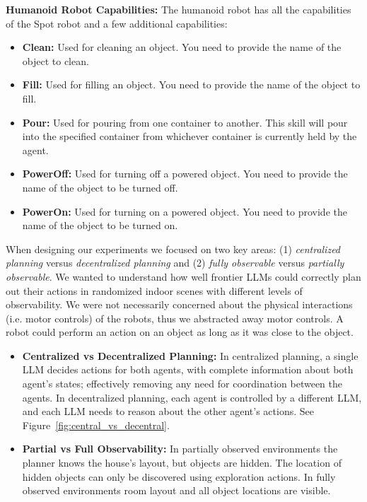 \textbf{Humanoid Robot Capabilities:} The humanoid robot has all the capabilities of the Spot robot and a few additional capabilities:

\begin{itemize}
      \item \textbf{Clean:}
            Used for cleaning an object. You need to provide the name of the object to clean.
      \item \textbf{Fill:}
            Used for filling an object. You need to provide the name of the object to fill.
      \item \textbf{Pour:}
            Used for pouring from one container to another. This skill will pour into the specified container from whichever container is currently held by the agent.
      \item \textbf{PowerOff:}
            Used for turning off a powered object. You need to provide the name of the object to be turned off.
      \item \textbf{PowerOn:}
            Used for turning on a powered object. You need to provide the name of the object to be turned on.
\end{itemize}

When designing our experiments we focused on two key areas: (1) \textit{centralized planning} versus \textit{decentralized planning} and (2) \textit{fully observable} versus \textit{partially observable}.  We wanted to understand how well frontier LLMs could correctly plan out their actions in randomized indoor scenes with different levels of observability.  We were not necessarily concerned about the physical interactions (i.e. motor controls) of the robots, thus we abstracted away motor controls.  A robot could perform an action on an object as long as it was close to the object.

\begin{itemize}
      \item \textbf{Centralized vs Decentralized Planning:}
            In centralized planning, a single LLM decides actions for both agents, with complete information about both agent's states; effectively removing any need for coordination between the agents. In decentralized planning, each agent is controlled by a different LLM, and each LLM needs to reason about the other agent's actions. See Figure~\ref{fig:central_vs_decentral}.
      \item \textbf{Partial vs Full Observability:}
            In partially observed environments the planner knows the house's layout, but objects are hidden.  The location of hidden objects can only be discovered using exploration actions. In fully observed environments room layout and all object locations are visible.
\end{itemize}

